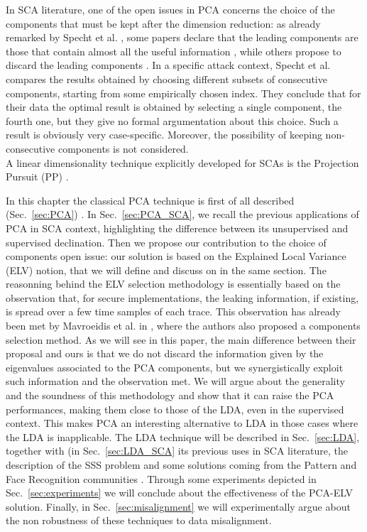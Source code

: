  In SCA literature, one of the open issues in PCA concerns the choice of the components that must be kept after the dimension reduction: as already remarked by Specht et al.  \cite{specht}, some papers declare that the leading components are those that contain almost all the useful information \cite{TAprincipal,choudary2014efficient}, while others propose to discard the leading components \cite{Batina2012}. In a specific attack context, Specht et al. compares the results obtained by choosing different subsets of consecutive components, starting from some empirically chosen index. They conclude that for their data the optimal result is obtained by selecting a single component, the fourth one, but they give no formal argumentation about this choice. Such a result is obviously very case-specific. Moreover, the possibility of keeping non-consecutive components is not considered. \\
 
 A linear dimensionality technique explicitly developed for SCAs is the Projection Pursuit (PP) \cite{PP}.
 
In this chapter the classical PCA technique is first of all described (Sec.~\ref{sec:PCA}) . In Sec.~\ref{sec:PCA_SCA}, we recall the previous applications of PCA in SCA context, highlighting the difference between its unsupervised and supervised declination. Then we propose our contribution to the choice of components open issue: our solution is based on the Explained Local Variance (ELV) notion, that we will define and discuss on in the same section. The reasonning behind the ELV selection methodology is essentially based on the observation that, for secure implementations, the leaking information, if existing, is spread over a few time samples of each trace. This observation has already been met by Mavroeidis et al. in \cite{SCAclassProbl}, where the authors  also proposed a components selection method. As we will see in this paper, the main difference between their proposal and ours is that we do not discard the information given by the eigenvalues associated to the PCA components, but we synergistically exploit such information and the observation met.  We will argue about the generality and the soundness of this methodology and show that it can raise the PCA performances, making them close to those of the LDA, even in the supervised context. This makes PCA an interesting alternative to LDA in those cases where the LDA is inapplicable. The LDA technique will be described in Sec.~\ref{sec:LDA}, together with (in Sec.~\ref{sec:LDA_SCA} its previous uses in SCA literature, the description of the SSS problem and some solutions coming from the Pattern and Face Recognition communities \cite{eigenfaces,Chen2000,huang,Yu01adirect}. Through some experiments depicted in Sec.~\ref{sec:experiments} we will conclude about the effectiveness of the PCA-ELV solution. Finally, in Sec.~\ref{sec:misalignment} we will experimentally argue about the non robustness of these techniques to data misalignment.

